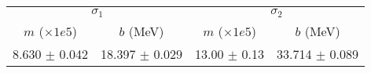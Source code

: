 \begin{tabular}{cc|cc}
\multicolumn{2}{c|}{$\sigma_1$} & \multicolumn{2}{|c}{$\sigma_2$} \\
$m$ ($\times1e5$) & $b$ (MeV) & $m$ ($\times1e5$) & $b$ (MeV) \\
\hline
8.630 $\pm$ 0.042 & 18.397 $\pm$ 0.029 & 13.00 $\pm$ 0.13 & 33.714 $\pm$ 0.089\\
\end{tabular}

